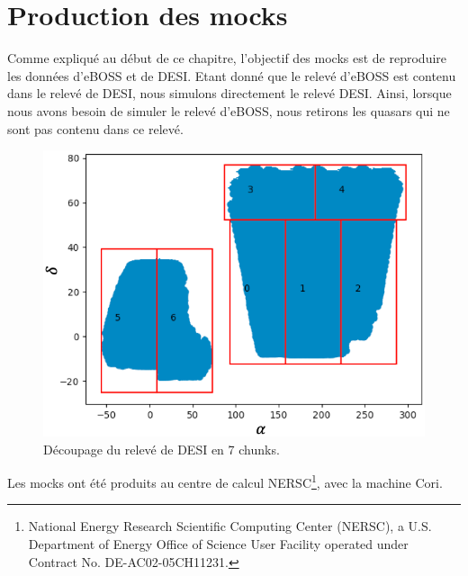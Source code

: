 \documentclass[11pt, twoside, a4paper, openright]{report}
\begin{document}
\section{Production des mocks}
Comme expliqué au début de ce chapitre, l'objectif des mocks est de reproduire les données d'eBOSS et de DESI. Etant donné que le relevé d'eBOSS est contenu dans le relevé de DESI, nous simulons directement le relevé DESI. Ainsi, lorsque nous avons besoin de simuler le relevé d'eBOSS, nous retirons les quasars qui ne sont pas contenu dans ce relevé.
\begin{figure}
  \centering
  \includegraphics[scale=0.5]{chunks}
  \caption{Découpage du relevé de DESI en 7 chunks.}
  \label{fig:chunks}
\end{figure}
Les mocks ont été produits au centre de calcul NERSC\footnote{National Energy Research Scientific Computing Center (NERSC), a U.S. Department of Energy Office of Science User Facility operated under Contract No. DE-AC02-05CH11231.}, avec la machine Cori.
\end{document}
